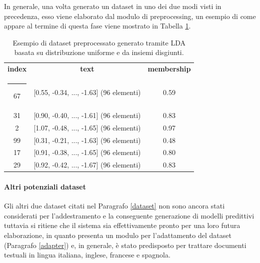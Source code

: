 \documentclass[12pt]{report}
\makeatletter
\theoremstyle{definition}
\newcommand{\thickhline}{%
    \noalign {\ifnum 0=`}\fi \hrule height 1pt
    \futurelet \reserved@a \@xhline
}
\makeatother
\begin{document}
In generale, una volta generato un dataset in uno dei due modi visti in precedenza, esso viene elaborato dal modulo di preprocessing, un esempio di come appare al termine di questa fase viene mostrato in Tabella \ref{uniformlda}.
\begin{table}[!h]
\centering
 \begin{tabular}{|c|c|c|} 
 \hline 
 \textbf{index} & \textbf{text} & \textbf{membership}
\\ [0.5ex] 
 \thickhline
67 & [0.55, -0.34, ..., -1.63] (96 elementi) & 0.59 \\
31 & [0.90, -0.40, ..., -1.61] (96 elementi) & 0.83\\ 
2 & [1.07, -0.48, ..., -1.65] (96 elementi) & 0.97\\
99 & [0.31, -0.21, ..., -1.63] (96 elementi) & 0.48\\
17 & [0.91, -0.38, ..., -1.65] (96 elementi) & 0.80\\
29 & [0.92, -0.42, ..., -1.67] (96 elementi) & 0.83\\
 \hline
\end{tabular}
\caption{Esempio di dataset preprocessato generato tramite LDA basata su distribuzione uniforme e da insiemi disgiunti.}
\label{uniformlda}
\end{table}

\paragraph{Altri potenziali dataset}
Gli altri due dataset citati nel Paragrafo \ref{dataset} non sono ancora stati considerati per l'addestramento e la conseguente generazione di modelli predittivi tuttavia si ritiene che il sistema sia effettivamente pronto per una loro futura elaborazione, in quanto presenta un modulo per l'adattamento del dataset (Paragrafo \ref{adapter}) e, in generale, è stato predisposto per trattare documenti testuali in lingua italiana, inglese, francese e spagnola.
\end{document}

